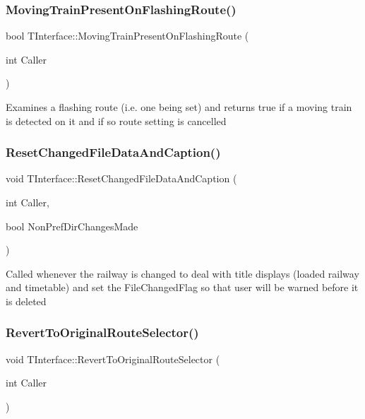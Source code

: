 \subsubsection{\texorpdfstring{Moving\+Train\+Present\+On\+Flashing\+Route()}{MovingTrainPresentOnFlashingRoute()}}
{\footnotesize\ttfamily bool T\+Interface\+::\+Moving\+Train\+Present\+On\+Flashing\+Route (\begin{DoxyParamCaption}\item[{int}]{Caller }\end{DoxyParamCaption})\hspace{0.3cm}{\ttfamily [private]}}

Examines a flashing route (i.\+e. one being set) and returns true if a moving train is detected on it and if so route setting is cancelled \mbox{\label{class_t_interface_a397ecca8b2fb1f85b265938a4e565de4}} 
\subsubsection{\texorpdfstring{Reset\+Changed\+File\+Data\+And\+Caption()}{ResetChangedFileDataAndCaption()}}
{\footnotesize\ttfamily void T\+Interface\+::\+Reset\+Changed\+File\+Data\+And\+Caption (\begin{DoxyParamCaption}\item[{int}]{Caller,  }\item[{bool}]{Non\+Pref\+Dir\+Changes\+Made }\end{DoxyParamCaption})\hspace{0.3cm}{\ttfamily [private]}}

Called whenever the railway is changed to deal with title displays (loaded railway and timetable) and set the File\+Changed\+Flag so that user will be warned before it is deleted \mbox{\label{class_t_interface_a0f47d9e893d3558de2e6d9082b3fadd0}} 
\subsubsection{\texorpdfstring{Revert\+To\+Original\+Route\+Selector()}{RevertToOriginalRouteSelector()}}
{\footnotesize\ttfamily void T\+Interface\+::\+Revert\+To\+Original\+Route\+Selector (\begin{DoxyParamCaption}\item[{int}]{Caller }\end{DoxyParamCaption})\hspace{0.3cm}{\ttfamily [private]}}

